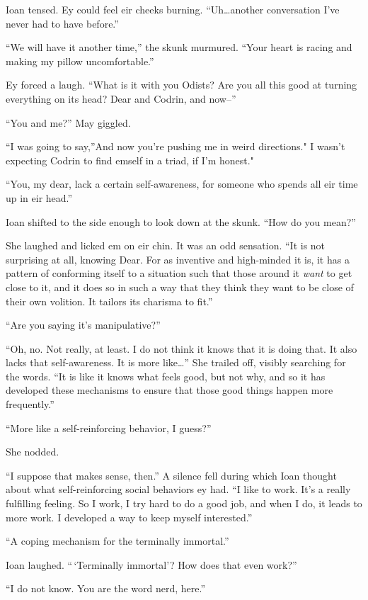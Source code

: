 Ioan tensed. Ey could feel eir cheeks burning. ``Uh\ldots another conversation I've never had to have before.''

``We will have it another time,'' the skunk murmured. ``Your heart is racing and making my pillow uncomfortable.''

Ey forced a laugh. ``What is it with you Odists? Are you all this good at turning everything on its head? Dear and Codrin, and now--''

``You and me?'' May giggled.

``I was going to say,''And now you're pushing me in weird directions." I wasn't expecting Codrin to find emself in a triad, if I'm honest."

``You, my dear, lack a certain self-awareness, for someone who spends all eir time up in eir head.''

Ioan shifted to the side enough to look down at the skunk. ``How do you mean?''

She laughed and licked em on eir chin. It was an odd sensation. ``It is not surprising at all, knowing Dear. For as inventive and high-minded it is, it has a pattern of conforming itself to a situation such that those around it \emph{want} to get close to it, and it does so in such a way that they think they want to be close of their own volition. It tailors its charisma to fit.''

``Are you saying it's manipulative?''

``Oh, no. Not really, at least. I do not think it knows that it is doing that. It also lacks that self-awareness. It is more like\ldots{}'' She trailed off, visibly searching for the words. ``It is like it knows what feels good, but not why, and so it has developed these mechanisms to ensure that those good things happen more frequently.''

``More like a self-reinforcing behavior, I guess?''

She nodded.

``I suppose that makes sense, then.'' A silence fell during which Ioan thought about what self-reinforcing social behaviors ey had. ``I like to work. It's a really fulfilling feeling. So I work, I try hard to do a good job, and when I do, it leads to more work. I developed a way to keep myself interested.''

``A coping mechanism for the terminally immortal.''

Ioan laughed. ``\,`Terminally immortal'? How does that even work?''

``I do not know. You are the word nerd, here.''

